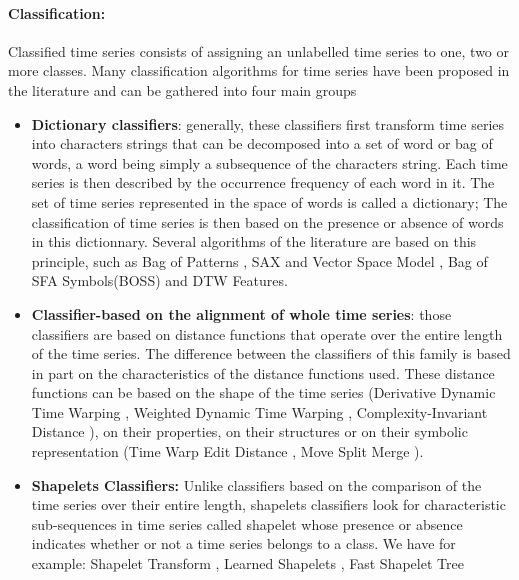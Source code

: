 \paragraph{Classification:}
Classified time series consists of assigning an unlabelled time series to one, two or more classes. Many classification algorithms for time series have been proposed in the literature and can be gathered into four main groups
\begin{itemize}
\item \textbf{Dictionary classifiers}: generally, these classifiers first transform time series into characters strings that can be decomposed into a set of word or bag of words, a word being simply a subsequence of the characters string. Each time series is then described by the occurrence frequency of each word in it. The set of time series represented in the space of words is called a dictionary; The classification of time series is then based on the presence or absence of words in this dictionnary. Several algorithms of the literature are based on this principle, such as Bag of Patterns \cite{lin2012rotation},  SAX and Vector Space Model \cite{senin2013sax}, Bag of SFA Symbols(BOSS) \cite{schafer2015boss} and DTW Features\cite{kate2016using}.

\item \textbf{Classifier-based on the alignment of whole time series}: those classifiers are based on distance functions that operate over the entire length of the time series. The difference between the classifiers of this family is based in part on the characteristics of the distance functions used. These distance functions can be based on the shape of the time series (Derivative Dynamic Time Warping  \cite{keogh2001derivative}, Weighted Dynamic Time Warping  \cite{jeong2011weighted}, Complexity-Invariant Distance  \cite{batista2011complexity}), on their properties, on their structures or on their symbolic representation (Time Warp Edit Distance \cite{marteau2008time}, Move Split Merge \cite{stefan2013move}).

\item \textbf{Shapelets Classifiers:}  Unlike classifiers based on the comparison of the time series over their entire length, shapelets classifiers look for characteristic sub-sequences in time series called shapelet whose presence or absence indicates whether or not a time series belongs to a class. We have for example: Shapelet Transform \cite{lines2012shapelet}, Learned Shapelets \cite{grabocka2014learning}, Fast Shapelet Tree \cite{rakthanmanon2013fast}


\end{itemize}
